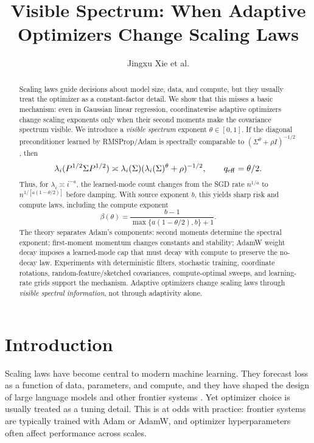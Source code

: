 \documentclass{article}
\title{Visible Spectrum: When Adaptive Optimizers Change Scaling Laws}
\author{Jingxu Xie et al.}
\begin{document}
\maketitle

\begin{abstract}
Scaling laws guide decisions about model size, data, and compute, but they usually treat the optimizer as a constant-factor detail.  We show that this misses a basic mechanism: even in Gaussian linear regression, coordinatewise adaptive optimizers change scaling exponents only when their second moments make the covariance spectrum visible.  We introduce a \emph{visible spectrum} exponent $\theta\in[0,1]$.  If the diagonal preconditioner learned by RMSProp/Adam is spectrally comparable to $(\Sigma^\theta+\rho I)^{-1/2}$, then
\[
    \lambda_i(P^{1/2}\Sigma P^{1/2})
    \asymp
    \lambda_i(\Sigma)(\lambda_i(\Sigma)^\theta+\rho)^{-1/2},
    \qquad
    q_{\rm eff}=\theta/2.
\]
Thus, for $\lambda_i\asymp i^{-a}$, the learned-mode count changes from the SGD rate $n^{1/a}$ to $n^{1/[a(1-\theta/2)]}$ before damping.  With source exponent $b$, this yields sharp risk and compute laws, including the compute exponent
\[
    \beta(\theta)=\frac{b-1}{\max\{a(1-\theta/2),b\}+1}.
\]
The theory separates Adam's components: second moments determine the spectral exponent; first-moment momentum changes constants and stability; AdamW weight decay imposes a learned-mode cap that must decay with compute to preserve the no-decay law.  Experiments with deterministic filters, stochastic training, coordinate rotations, random-feature/sketched covariances, compute-optimal sweeps, and learning-rate grids support the mechanism.  Adaptive optimizers change scaling laws through \emph{visible spectral information}, not through adaptivity alone.
\end{abstract}

\section{Introduction}
Scaling laws have become central to modern machine learning.  They forecast loss as a function of data, parameters, and compute, and they have shaped the design of large language models and other frontier systems \citep{hestness2017deep,kaplan2020scaling,henighan2020scaling,hoffmann2022training}.  Yet optimizer choice is usually treated as a tuning detail.  This is at odds with practice: frontier systems are typically trained with Adam or AdamW, and optimizer hyperparameters often affect performance across scales.
\end{document}
